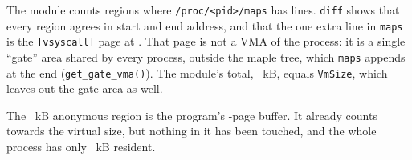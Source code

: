 The module counts \OneRegions{} regions where
\texttt{/proc/<pid>/maps} has \OneMapsLines{} lines. \texttt{diff} shows that
every region agrees in start and end address, and that the one extra line in
\texttt{maps} is the \texttt{[vsyscall]} page at \texttt{\OneVsyscall}. That
page is not a VMA of the process: it is a single ``gate'' area shared by every
process, outside the maple tree, which \texttt{maps} appends at the end
(\texttt{get\_gate\_vma()}). The module's total, \OneVirtualKB{}~kB, equals
\texttt{VmSize}, which leaves out the gate area as well.

The \TouchBufferKB{}~kB anonymous region is the program's \TouchPages{}-page
buffer. It already
counts towards the virtual size, but nothing in it has been touched, and the
whole process has only \OneRssKB{}~kB resident.

